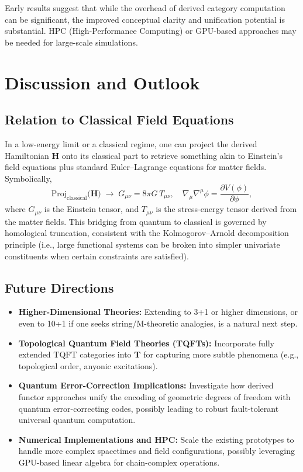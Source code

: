 \documentclass[11pt]{article}
\begin{document}
Early results suggest that while the overhead of derived category computation can be significant, the improved conceptual clarity and unification potential is substantial. HPC (High-Performance Computing) or GPU-based approaches may be needed for large-scale simulations.

\section{Discussion and Outlook}
\label{sec:discussion}

\subsection{Relation to Classical Field Equations}

In a low-energy limit or a classical regime, one can project the derived Hamiltonian $\mathbf{H}$ onto its classical part to retrieve something akin to Einstein's field equations plus standard Euler--Lagrange equations for matter fields. Symbolically,
\[
\text{Proj}_{\mathrm{classical}}\bigl(\mathbf{H}\bigr) 
\;\longrightarrow\; 
G_{\mu\nu} = 8\pi G\,T_{\mu\nu}, \quad 
\nabla_\mu \nabla^\mu \phi = \frac{\partial V(\phi)}{\partial \phi}, 
\]
where $G_{\mu\nu}$ is the Einstein tensor, and $T_{\mu\nu}$ is the stress-energy tensor derived from the matter fields. This bridging from quantum to classical is governed by homological truncation, consistent with the Kolmogorov--Arnold decomposition principle (i.e., large functional systems can be broken into simpler univariate constituents when certain constraints are satisfied).

\subsection{Future Directions}

\begin{itemize}
    \item \textbf{Higher-Dimensional Theories:} Extending to 3+1 or higher dimensions, or even to 10+1 if one seeks string/M-theoretic analogies, is a natural next step.
    \item \textbf{Topological Quantum Field Theories (TQFTs):} Incorporate fully extended TQFT categories into $\mathbf{T}$ for capturing more subtle phenomena (e.g., topological order, anyonic excitations).
    \item \textbf{Quantum Error-Correction Implications:} Investigate how derived functor approaches unify the encoding of geometric degrees of freedom with quantum error-correcting codes, possibly leading to robust fault-tolerant universal quantum computation.
    \item \textbf{Numerical Implementations and HPC:} Scale the existing prototypes to handle more complex spacetimes and field configurations, possibly leveraging GPU-based linear algebra for chain-complex operations.
\end{itemize}
\end{document}
